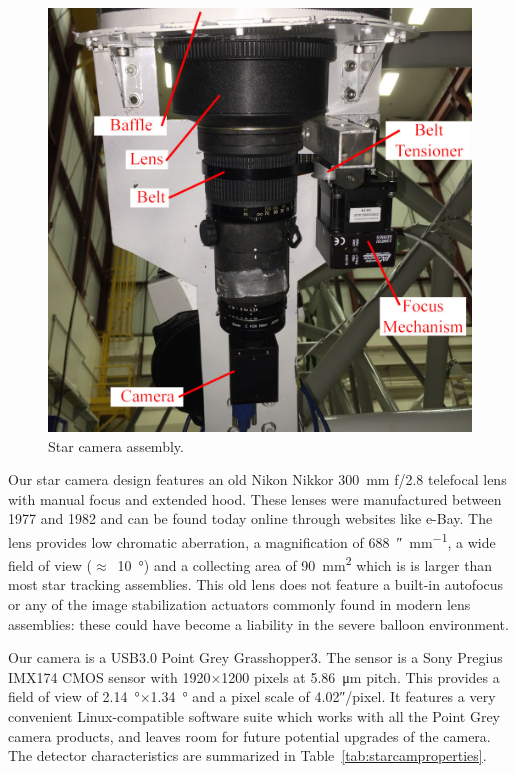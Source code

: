 \begin{figure}[!h]
		\centering
		\includegraphics[width=\textwidth]{Figures/StarCamera.jpg} 
		\caption[Star camera assembly]{Star camera assembly.}
		\label{fig:StarCamera}
\end{figure}


Our star camera design features an old Nikon Nikkor \SI{300}{\mm} f/2.8 telefocal lens with manual focus and extended hood. These lenses were manufactured between 1977 and 1982 and can be found today online through websites like e-Bay. The lens provides low chromatic aberration, a magnification of \SI{688}{\arcsecond\per\mm}, a wide field of view ($\approx$~\SI{10}{\degree}) and a collecting area of \SI{90}{\mm\squared} which is is larger than most star tracking assemblies. This old lens does not feature a built-in autofocus or any of the image stabilization actuators commonly found in modern lens assemblies: these could have become a liability in the severe balloon environment. 

Our camera is a USB3.0 Point Grey Grasshopper3. The sensor is a Sony Pregius IMX174 CMOS sensor with 1920$\times$1200 pixels at \SI{5.86}{\um} pitch. This provides a field of view of \SI{2.14}{\degree}$\times$\SI{1.34}{\degree} and a pixel scale of \ang{;;4.02}/pixel. It features a very convenient Linux-compatible software suite which works with all the Point Grey camera products, and leaves room for future potential upgrades of the camera. The detector characteristics are summarized in Table~\ref{tab:starcamproperties}.

